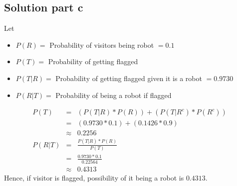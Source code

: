 \documentclass[12pt]{article}%
\begin{document}
\subsection*{Solution part c}
Let
\begin{itemize}
\item $P(R) =$ Probability of visitors being robot $= 0.1$
\item $P(T) =$ Probability of getting flagged 
\item $P(T|R) =$ Probability of getting flagged given it is a robot $= 0.9730$
\item $P(R|T) =$ Probability of being a robot if flagged 
\end{itemize}
\begin{eqnarray*}
P(T)   & = & (P(T|R)*P(R)) + (P(T|R^c)*P(R^c)) \\
       & = & (0.9730 * 0.1) + (0.1426 * 0.9) \\
       & \approx & 0.2256 \\
P(R|T) & = & \frac{P(T|R)*P(R)}{P(T)} \\
	   & = & \frac{0.9730 * 0.1}{0.22564} \\
	   & \approx & 0.4313         
\end{eqnarray*}
Hence, if visitor is flagged, possibility of it being a robot is $0.4313$.
\end{document}
